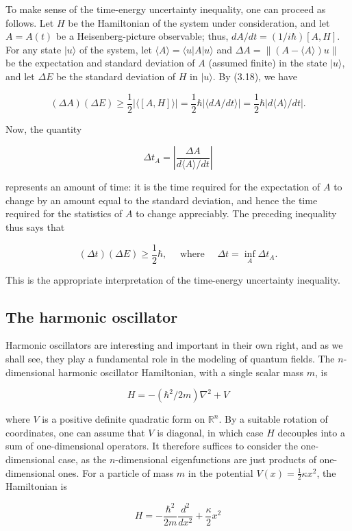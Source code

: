 \documentclass[10pt, letterpaper]{article}
\begin{document}
To make sense of the time-energy uncertainty inequality, one can proceed as follows. Let $H$ be the Hamiltonian of the system under consideration, and let $A=A(t)$ be a Heisenberg-picture observable; thus, $d A / d t=(1 / i \hbar)[A, H]$. For any state $|u\rangle$ of the system, let $\langle A\rangle=\langle u| A|u\rangle$ and $\Delta A=\|(A-\langle A\rangle) u\|$ be the expectation and standard deviation of $A$ (assumed finite) in the state $|u\rangle$, and let $\Delta E$ be the standard deviation of $H$ in $|u\rangle$. By (3.18), we have

$$
(\Delta A)(\Delta E) \geq \frac{1}{2}|\langle[A, H]\rangle|=\frac{1}{2} \hbar|\langle d A / d t\rangle|=\frac{1}{2} \hbar|d\langle A\rangle / d t| .
$$

Now, the quantity

$$
\Delta t_{A}=\left|\frac{\Delta A}{d\langle A\rangle / d t}\right|
$$

represents an amount of time: it is the time required for the expectation of $A$ to change by an amount equal to the standard deviation, and hence the time required for the statistics of $A$ to change appreciably. The preceding inequality thus says that

$$
(\Delta t)(\Delta E) \geq \frac{1}{2} \hbar, \quad \text { where } \quad \Delta t=\inf _{A} \Delta t_{A} .
$$

This is the appropriate interpretation of the time-energy uncertainty inequality.

\subsection*{The harmonic oscillator}
Harmonic oscillators are interesting and important in their own right, and as we shall see, they play a fundamental role in the modeling of quantum fields. The $n$-dimensional harmonic oscillator Hamiltonian, with a single scalar mass $m$, is

$$
H=-\left(\hbar^{2} / 2 m\right) \nabla^{2}+V
$$

where $V$ is a positive definite quadratic form on $\mathbb{R}^{n}$. By a suitable rotation of coordinates, one can assume that $V$ is diagonal, in which case $H$ decouples into a sum of one-dimensional operators. It therefore suffices to consider the one-dimensional case, as the $n$-dimensional eigenfunctions are just products of one-dimensional ones. For a particle of mass $m$ in the potential $V(x)=\frac{1}{2} \kappa x^{2}$, the Hamiltonian is

$$
H=-\frac{\hbar^{2}}{2 m} \frac{d^{2}}{d x^{2}}+\frac{\kappa}{2} x^{2}
$$
\end{document}

